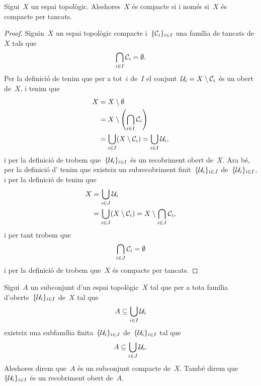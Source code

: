 \documentclass[../../Main.tex]{subfiles}
\begin{document}
	\begin{proposition}
		\label{prop:compacte si i només si compacte per tancats}
		\label{prop:equivalència entre compacitat i compacitat per tancats}
		Sigui~\(X\) un espai topològic.
		Aleshores~\(X\) és compacte si i només si~\(X\) és compacte per tancats.
		\begin{proof}
			Siguin~\(X\) un espai topològic compacte i~\(\{\mathcal{C}_{i}\}_{i\in I}\) una família de tancats de~\(X\) tals que
			\[
			    \bigcap_{i\in I}\mathcal{C}_{i}=\emptyset.
			\]
			Per la definició de  tenim que per a tot~\(i\) de~\(I\) el conjunt~\(\mathcal{U}_{i}=X\setminus\mathcal{C}_{i}\) és un obert de~\(X\), i tenim que
			\begin{align*}
				X&=X\setminus\emptyset \\
				&=X\setminus\left(\bigcap_{i\in I}\tancat{C}_{i}\right) \\
				&=\bigcup_{i\in I}(X\setminus\tancat{C}_{i})=\bigcup_{i\in I}\obert{U}_{i},
			\end{align*}
			i per la definició de  trobem que~\(\{\mathcal{U}_{i}\}_{i\in I}\) és un recobriment obert de~\(X\).
			Ara bé, per la definició d' tenim que existeix un subrecobriment finit~\(\{\mathcal{U}_{i}\}_{i\in J}\) de~\(\{\mathcal{U}_{i}\}_{i\in I}\), i per la definició de  tenim que
			\begin{align*}
				X&=\bigcup_{i\in J}\mathcal{U}_{i} \\
				&=\bigcup_{i\in J}(X\setminus\mathcal{C}_{i})=X\setminus\bigcap_{i\in J}\mathcal{C}_{i},
			\end{align*} %
			i per tant trobem que
			\[
			    \bigcap_{i\in J}\mathcal{C}_{i}=\emptyset
			\]
			i per la definició de  trobem que~\(X\) és compacte per tancats.
		\end{proof}
	\end{proposition}
	\begin{definition}
		\label{def:compacitat d'un subconjunt}
		\label{def:subconjunt compacte}
		\label{def:recobriment obert d'un subconjunt}
		Sigui~\(A\) un subconjunt d'un espai topològic~\(X\) tal que per a tota família d'oberts~\(\{\mathcal{U}_{i}\}_{i\in I}\) de~\(X\) tal que
		\[
		    A\subseteq\bigcup_{i\in I}\mathcal{U}_{i}
		\]
		existeix una subfamília finita~\(\{\mathcal{U}_{i}\}_{i\in J}\) de~\(\{\mathcal{U}_{i}\}_{i\in I}\) tal que
		\[
		    A\subseteq\bigcup_{i\in J}\mathcal{U}_{i}.
		\]
		Aleshores direm que~\(A\) és un subconjunt compacte de~\(X\).
		També direm que~\(\{\mathcal{U}_{i}\}_{i\in I}\) és un recobriment obert de~\(A\).
	\end{definition}
\end{document}
